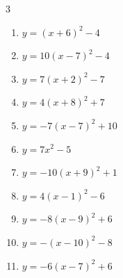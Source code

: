 \begin{multicols}{3}
\begin{enumerate}
  \item $\displaystyle y=\left( x+6\right)^{2}-4$

        \phantom{$\displaystyle 頂点\left( -6 , -4 \right)$}

  \item $\displaystyle y=10\left( x-7\right)^{2}-4$

        \phantom{$\displaystyle 頂点\left( 7 , -4 \right)$}

  \item $\displaystyle y=7\left( x+2\right)^{2}-7$

        \phantom{$\displaystyle 頂点\left( -2 , -7 \right)$}

  \item $\displaystyle y=4\left( x+8\right)^{2}+7$

        \phantom{$\displaystyle 頂点\left( -8 , 7 \right)$}

  \item $\displaystyle y=-7\left( x-7\right)^{2}+10$

        \phantom{$\displaystyle 頂点\left( 7 , 10 \right)$}

\columnbreak %

\resetques

  \item $\displaystyle y=7x^{2}-5$

        \phantom{$\displaystyle 頂点\left( 0 , -5 \right)$}

  \item $\displaystyle y=-10\left( x+9\right)^{2}+1$

        \phantom{$\displaystyle 頂点\left( -9 , 1 \right)$}

  \item $\displaystyle y=4\left( x-1\right)^{2}-6$

        \phantom{$\displaystyle 頂点\left( 1 , -6 \right)$}

  \item $\displaystyle y=-8\left( x-9\right)^{2}+6$

        \phantom{$\displaystyle 頂点\left( 9 , 6 \right)$}

  \item $\displaystyle y=-\left( x-10\right)^{2}-8$

        \phantom{$\displaystyle 頂点\left( 10 , -8 \right)$}

  \item $\displaystyle y=-6\left( x-7\right)^{2}+6$

        \phantom{$\displaystyle 頂点\left( 7 , 6 \right)$}


\end{enumerate}
\end{multicols}
